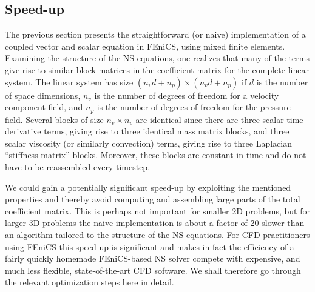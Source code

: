 \subsection{Speed-up}

The previous section presents the straightforward (or naive)
implementation of a coupled vector and scalar equation in FEniCS,
using mixed finite elements.  Examining the structure of the NS
equations, one realizes that many of the terms give rise to similar
block matrices in the coefficient matrix for the complete linear
system. The linear system has size $(n_vd+n_p)\times (n_vd+n_p)$ 
if $d$ is the number
of space dimensions, $n_v$ is the number of degrees of freedom for
a velocity component field, and $n_p$ is the number of degrees of
freedom for the pressure field.
Several blocks of size $n_v\times n_v$ are identical since there are
three scalar time-derivative terms, giving rise to three identical
mass matrix blocks, and
three scalar viscosity (or similarly convection) terms, giving rise to three
Laplacian ``stiffness matrix'' blocks. 
Moreover, these blocks are constant
in time and do not have to be reassembled every timestep.

We could gain a potentially significant speed-up by exploiting the
mentioned properties and thereby avoid computing and assembling large parts
of the total coefficient matrix. This is perhaps not important for
smaller 2D problems, but for larger 3D problems the naive
implementation is about a factor of 20 slower than an algorithm
tailored to the structure of the NS equations.  For CFD practitioners
using FEniCS this speed-up is significant and makes in fact the
efficiency of a fairly quickly homemade FEniCS-based NS solver compete
with expensive, and much less flexible, state-of-the-art CFD software.
We shall therefore go through the relevant optimization steps here in detail.

